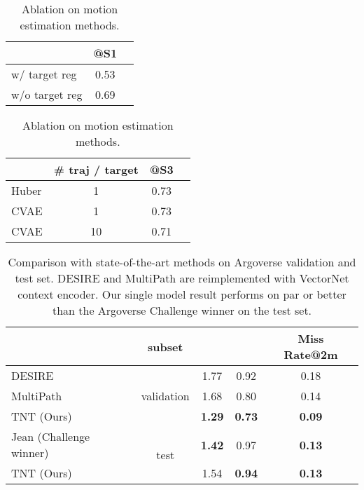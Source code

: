 \documentclass{article}
\begin{document}
\begin{table}[h]
\small
    \begin{minipage}{.48\linewidth}
    \centering
    \caption{Ablation on target offset regression.}
      \label{tbl-target}
      \centering
    \begin{tabular}{l|cc}
    \toprule
            & @S1 \\ 
    \midrule
    w/ target reg  & 0.53      \\ 
    w/o target reg & 0.69     \\ 
    \bottomrule
    \end{tabular}
    \end{minipage}
    \begin{minipage}{.48\linewidth}
    \centering
    \caption{Ablation on motion estimation methods.}
      \label{tbl-ablation-s2}
      \centering
    \begin{tabular}{l|c|cc}
    \toprule
            & \# traj / target & @S3  \\ 
    \midrule
    Huber & 1   &  0.73 \\ 
CVAE & 1 & 0.73 \\
    CVAE & 10 & 0.71 \\
    \bottomrule
    \end{tabular}
    \end{minipage}
\end{table}

\begin{table}[ht]
    \caption{Comparison with state-of-the-art methods on Argoverse validation and test set. DESIRE and MultiPath are reimplemented with VectorNet context encoder. Our single model result performs on par or better than the Argoverse Challenge winner on the test set.}
      \label{tbl-argo}
      \centering
    \begin{tabular}{l|c|c c c}
    \toprule
    & subset  &  &  & Miss Rate@2m\\  
    \midrule
    DESIRE~\cite{DESIRE} & \multirow{3}{*}{validation}  & 1.77 & 0.92 & 0.18\\ 
    MultiPath~\cite{chai2019multipath} & & 1.68 & 0.80 & 0.14 \\ 
    TNT (Ours) & & \textbf{1.29} & \textbf{0.73} & \textbf{0.09} \\
    \midrule
    Jean (Challenge winner) & \multirow{2}{*}{test} & \textbf{1.42} & 0.97 & \textbf{0.13} \\
    TNT (Ours) & & 1.54 & \textbf{0.94} & \textbf{0.13} \\
    \bottomrule
    \end{tabular}
\end{table}
\end{document}
